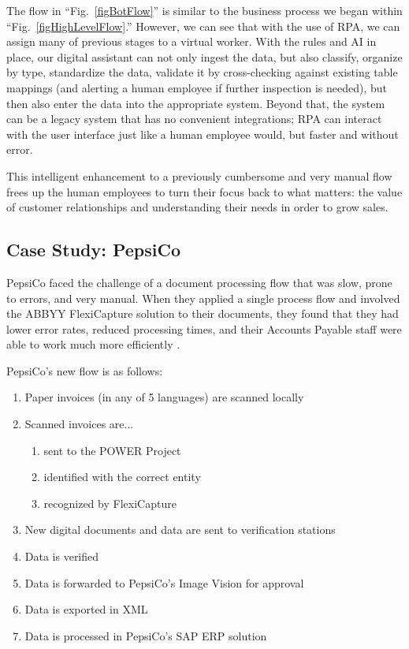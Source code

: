 \documentclass[conference]{IEEEtran}
\begin{document}
The flow in ``Fig.~\ref{figBotFlow}'' is similar to the business process we began within ``Fig.~\ref{figHighLevelFlow}.'' However, we can see that with the use of RPA, we can assign many of previous stages to a virtual worker. With the rules and AI in place, our digital assistant can not only ingest the data, but also classify, organize by type, standardize the data, validate it by cross-checking against existing table mappings (and alerting a human employee if further inspection is needed), but then also enter the data into the appropriate system. Beyond that, the system can be a legacy system that has no convenient integrations; RPA can interact with the user interface just like a human employee would, but faster and without error.

This intelligent enhancement to a previously cumbersome and very manual flow frees up the human employees to turn their focus back to what matters: the value of customer relationships and understanding their needs in order to grow sales.

\subsection{Case Study: PepsiCo}
PepsiCo faced the challenge of a document processing flow that was slow, prone to errors, and very manual. When they applied a single process flow and involved the ABBYY FlexiCapture solution to their documents, they found that they had lower error rates, reduced processing times, and their Accounts Payable staff were able to work much more efficiently \cite{pepsico}.

PepsiCo's new flow is as follows:
\begin{enumerate}
\item Paper invoices (in any of 5 languages) are scanned locally
\item Scanned invoices are...
    \begin{enumerate}
        \item sent to the POWER Project
        \item identified with the correct entity
        \item recognized by FlexiCapture
    \end{enumerate}
\item New digital documents and data are sent to verification stations
\item Data is verified
\item Data is forwarded to PepsiCo's Image Vision for approval
\item Data is exported in XML
\item Data is processed in PepsiCo's SAP ERP solution
\end{enumerate}
\end{document}
